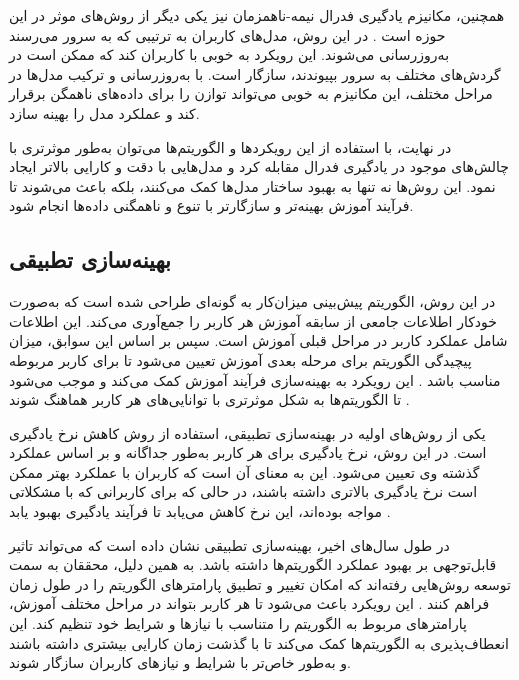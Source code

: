 همچنین، مکانیزم یادگیری فدرال نیمه-ناهمزمان%
نیز یکی دیگر از روش‌های موثر در این حوزه است
\cite{ma2021fedsa}.
در این روش، مدل‌های کاربران به ترتیبی که به سرور می‌رسند به‌روزرسانی می‌شوند. این رویکرد به خوبی با کاربران کند%
که ممکن است در گردش‌های مختلف به سرور بپیوندند، سازگار است. با به‌روزرسانی و ترکیب مدل‌ها در مراحل مختلف، این مکانیزم به خوبی می‌تواند توازن را برای داده‌های ناهمگن برقرار کند و عملکرد مدل را بهینه سازد.

در نهایت، با استفاده از این رویکردها و الگوریتم‌ها می‌توان به‌طور موثرتری با چالش‌های موجود در یادگیری فدرال مقابله کرد و مدل‌هایی با دقت و کارایی بالاتر ایجاد نمود. این روش‌ها نه تنها به بهبود ساختار مدل‌ها کمک می‌کنند، بلکه باعث می‌شوند تا فرآیند آموزش بهینه‌تر و سازگارتر با تنوع و ناهمگنی داده‌ها انجام شود.


\subsection{
	بهینه‌سازی تطبیقی%
}
در این روش، الگوریتم پیش‌بینی میزان‌کار به گونه‌ای طراحی شده است که به‌صورت خودکار اطلاعات جامعی از سابقه آموزش هر کاربر را جمع‌آوری می‌کند. این اطلاعات شامل عملکرد کاربر در مراحل قبلی آموزش است. سپس بر اساس این سوابق، میزان پیچیدگی الگوریتم برای مرحله بعدی آموزش تعیین می‌شود تا برای کاربر مربوطه مناسب باشد . این رویکرد به بهینه‌سازی فرآیند آموزش کمک می‌کند و موجب می‌شود تا الگوریتم‌ها به شکل موثرتری با توانایی‌های هر کاربر هماهنگ شوند
\cite{li2021fedsae}.

یکی از روش‌های اولیه در بهینه‌سازی تطبیقی، استفاده از روش کاهش نرخ یادگیری است. در این روش، نرخ یادگیری برای هر کاربر به‌طور جداگانه و بر اساس عملکرد گذشته وی تعیین می‌شود. این به معنای آن است که کاربران با عملکرد بهتر ممکن است نرخ یادگیری بالاتری داشته باشند، در حالی که برای کاربرانی که با مشکلاتی مواجه بوده‌اند، این نرخ کاهش می‌یابد تا فرآیند یادگیری بهبود یابد
\cite{reddi2020adaptive}.

در طول سال‌های اخیر، بهینه‌سازی تطبیقی نشان داده است که می‌تواند تاثیر قابل‌توجهی بر بهبود عملکرد الگوریتم‌ها داشته باشد. به همین دلیل، محققان به سمت توسعه روش‌هایی رفته‌اند که امکان تغییر و تطبیق پارامترهای الگوریتم را در طول زمان فراهم کنند
\cite{reddi2020adaptive}.
این رویکرد باعث می‌شود تا هر کاربر بتواند در مراحل مختلف آموزش، پارامترهای مربوط به الگوریتم را متناسب با نیازها و شرایط خود تنظیم کند. این انعطاف‌پذیری به الگوریتم‌ها کمک می‌کند تا با گذشت زمان کارایی بیشتری داشته باشند و به‌طور خاص‌تر با شرایط و نیازهای کاربران سازگار شوند.

